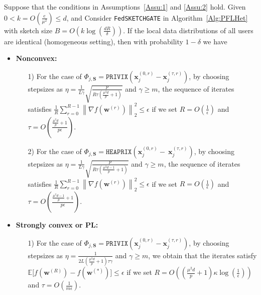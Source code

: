 \begin{theorem}\label{thm:hetreg_case}
  Suppose that the conditions in Assumptions~\ref{Assu:1} and \ref{Assu:2} hold. Given $0<k=O\left(\frac{e}{\mu^2}\right)\leq d$, and Consider \texttt{FedSKETCHGATE} in Algorithm~\ref{Alg:PFLHet} with sketch size $B=O\left(k\log\left(\frac{d R}{\delta}\right)\right)$. If the local data distributions of all users are identical (homogeneous setting), then with probability $1-\delta$ we have  
 \begin{itemize}
     \item \textbf{Nonconvex:}  
     \begin{itemize}
         \item [1)] For the case of $\Phi_{j,\mathbf{S}}=\texttt{PRIVIX}\left(\boldsymbol{x}_j^{(0,r)}-\boldsymbol{x}_j^{(\tau,r)}\right)$, by choosing stepsizes as $\eta=\frac{1}{L\gamma}\sqrt{\frac{p}{R\tau\left(\frac{\mu^2d}{p}+1\right)}}$ and $\gamma\geq m$, the sequence of iterates satisfies  $\frac{1}{R}\sum_{r=0}^{R-1}\left\|\nabla f({\boldsymbol{w}}^{(r)})\right\|_2^2\leq {\epsilon}$ if we set
     $R=O\left(\frac{1}{\epsilon}\right)$ and $ \tau=O\left(\frac{\frac{\mu^2d}{p}+1}{{p}\epsilon}\right)$.
         \item[2)] For the case of 
$  \Phi_{j,\mathbf{S}}=\texttt{HEAPRIX}\left(\boldsymbol{x}_j^{(0,r)}-~{\boldsymbol{x}}_{j}^{(\tau,r)}\right)$, by choosing stepsizes as $\eta=\frac{1}{L\gamma}\sqrt{\frac{p}{R\tau\left(\frac{\mu^2d-1}{p}+1\right)}}$ and $\gamma\geq m$, the sequence of iterates satisfies  $\frac{1}{R}\sum_{r=0}^{R-1}\left\|\nabla f({\boldsymbol{w}}^{(r)})\right\|_2^2\leq {\epsilon}$ if we set
     $R=O\left(\frac{1}{\epsilon}\right)$ and $ \tau=O\left(\frac{\frac{\mu^2d-1}{p}+1}{{p}\epsilon}\right)$. 
     \end{itemize}
     
     \item \textbf{Strongly convex or PL:}
      \begin{itemize}
          \item[1)] For the case of $\Phi_{j,\mathbf{S}}=\texttt{PRIVIX}\left(\boldsymbol{x}_j^{(0,r)}-\boldsymbol{x}_j^{(\tau,r)}\right)$, by choosing stepsizes as $\eta=\frac{1}{2L\left(\frac{\mu^2d}{p}+1\right)\tau\gamma}$ and $\gamma\geq m$, we obtain that the iterates satisfy $\mathbb{E}\Big[f({\boldsymbol{w}}^{(R)})-f({\boldsymbol{w}}^{(*)})\Big]\leq \epsilon$ if  we set
     $R=O\left(\left(\frac{\mu^2d}{p}+1\right)\kappa\log\left(\frac{1}{\epsilon}\right)\right)$ and $ \tau=O\left(\frac{1}{m\epsilon}\right)$.
          

\end{itemize}
\end{itemize}
\end{theorem}
